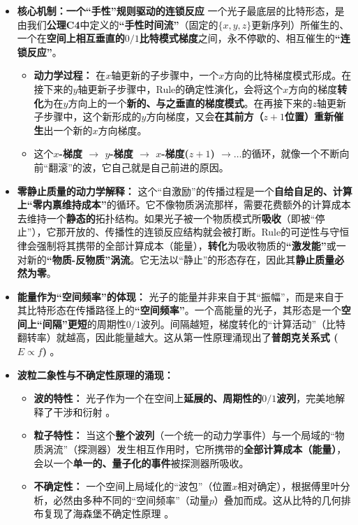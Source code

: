 \documentclass[11pt, a4paper]{article}
\begin{document}
\begin{itemize}
    \item \textbf{核心机制：一个“手性”规则驱动的连锁反应}
    一个光子最底层的比特形态，是由我们\textbf{公理C4}中定义的\textbf{“手性时间流”}（固定的$\{x, y, z\}$更新序列）所催生的、一个在\textbf{空间上相互垂直的$0/1$比特模式梯度}之间，永不停歇的、相互催生的\textbf{“连锁反应”}。
    \begin{itemize}
        \item \textbf{动力学过程：} 在$x$轴更新的子步骤中，一个$x$方向的比特梯度模式形成。在接下来的$y$轴更新子步骤中，Rule的确定性演化，会将这个$x$方向的梯度\textbf{转化}为在$y$方向上的一个\textbf{新的、与之垂直的梯度模式}。在再接下来的$z$轴更新子步骤中，这个新形成的$y$方向梯度，又会\textbf{在其前方（$z+1$位置）重新催生}出一个新的$x$方向梯度。
        \item 这个\textbf{$x$-梯度 $\rightarrow$ $y$-梯度 $\rightarrow$ $x$-梯度($z+1$) $\rightarrow \dots$}的循环，就像一个不断向前“翻滚”的波，它自己就是自己前进的原因。
    \end{itemize}

    \item \textbf{零静止质量的动力学解释：}
    这个“自激励”的传播过程是一个\textbf{自给自足的、计算上“零内禀维持成本”}的循环。它不像物质涡流那样，需要花费额外的计算成本去维持一个\textbf{静态的}拓扑结构。如果光子被一个物质模式所\textbf{吸收}（即被“停止”），它那开放的、传播性的连锁反应结构就会被打断。Rule的可逆性与守恒律会强制将其携带的全部计算成本（能量），\textbf{转化}为吸收物质的\textbf{“激发能”}或一对新的\textbf{“物质-反物质”涡流}。它无法以“静止”的形态存在，因此其\textbf{静止质量必然为零}。

    \item \textbf{能量作为“空间频率”的体现：}
    光子的能量并非来自于其“振幅”，而是来自于其比特形态在传播路径上的\textbf{“空间频率”}。一个高能量的光子，其形态是一个\textbf{空间上“间隔”更短}的周期性$0/1$波列。间隔越短，梯度转化的“计算活动”（比特翻转率）就越高，因此能量越大。这从第一性原理涌现出了\textbf{普朗克关系式 ($E \propto f$)} \cite{deBroglie1930}。

    \item \textbf{波粒二象性与不确定性原理的涌现：}
    \begin{itemize}
        \item \textbf{波的特性：} 光子作为一个在空间上\textbf{延展的、周期性的$0/1$波列}，完美地解释了干涉和衍射 \cite{deBroglie1930}。
        \item \textbf{粒子特性：} 当这个\textbf{整个波列}（一个统一的动力学事件）与一个局域的“物质涡流”（探测器）发生相互作用时，它所携带的\textbf{全部计算成本（能量）}，会以一个\textbf{单一的、量子化的事件}被探测器所吸收。
        \item \textbf{不确定性：} 一个空间上局域化的“波包”（位置$x$相对确定），根据傅里叶分析，必然由多种不同的“空间频率”（动量$p$）叠加而成。这从比特的几何排布复现了海森堡不确定性原理 \cite{deBroglie1930}。
    \end{itemize}


\end{itemize}
\end{document}
